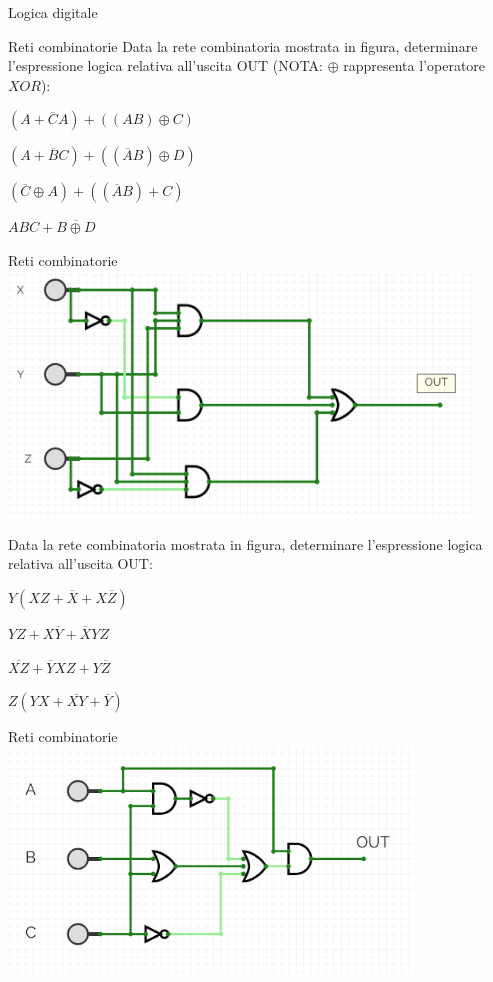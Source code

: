 \documentclass[11pt]{article}
\begin{document}
\begin{quiz}{Logica digitale}
\begin{multi}[points=1,shuffle=true]{Reti combinatorie}
    Data la rete combinatoria mostrata in figura, determinare l'espressione logica relativa all'uscita OUT (NOTA: $\oplus$ rappresenta l'operatore $XOR$):

    \item $(A+ \overline{C}A)+((AB) \oplus C)$
    \item* $(A+ \overline{B}C)+((\overline{A}B) \oplus D)$
    \item $(\overline{C}\oplus A)+((\overline{A}B) + C)$
    \item $ABC+ \overline{B \oplus D}$
\end{multi}

\begin{multi}[points=1,shuffle=true]{Reti combinatorie}
    \includegraphics[height=6.5cm]{figures/comb2.png}

    Data la rete combinatoria mostrata in figura, determinare l'espressione logica relativa all'uscita OUT:

    \item* $Y(XZ+ \overline{X}+X \overline{Z})$
    \item $YZ + X\overline{Y} +\overline{X}YZ$
    \item $\overline{XZ} + \overline{Y}XZ + Y\overline{Z}$
    \item $Z(YX+ \overline{XY}+ \overline{Y})$
\end{multi}

\begin{multi}[points=1,shuffle=true]{Reti combinatorie}
    \includegraphics[height=6cm]{figures/comb3.png}


\end{multi}
\end{quiz}
\end{document}
